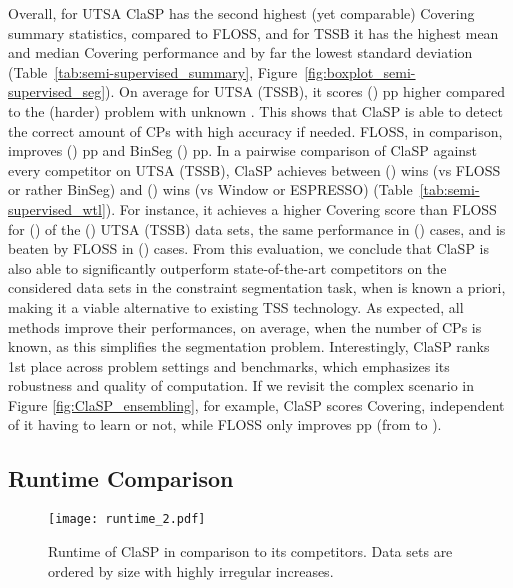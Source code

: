 \documentclass[pdflatex,sn-basic]{sn-jnl}
\begin{document}
Overall, for UTSA ClaSP has the second highest (yet comparable) Covering summary statistics, compared to FLOSS, and for TSSB it has the highest mean and median Covering performance and by far the lowest standard deviation (Table~\ref{tab:semi-supervised_summary}, Figure~\ref{fig:boxplot_semi-supervised_seg}). On average for UTSA (TSSB), it scores  () pp higher compared to the (harder) problem with unknown . This shows that ClaSP is able to detect the correct amount of CPs with high accuracy if needed. FLOSS, in comparison, improves  () pp and BinSeg  () pp. In a pairwise comparison of ClaSP against every competitor on UTSA (TSSB), ClaSP achieves between  () wins (vs FLOSS or rather BinSeg) and  () wins (vs Window or ESPRESSO) (Table~\ref{tab:semi-supervised_wtl}). For instance, it achieves a higher Covering score than FLOSS for  () of the  () UTSA (TSSB) data sets, the same performance in  () cases, and is beaten by FLOSS in  () cases. From this evaluation, we conclude that ClaSP is also able to significantly outperform state-of-the-art competitors on the considered data sets in the constraint segmentation task, when  is known a priori, making it a viable alternative to existing TSS technology. As expected, all methods improve their performances, on average, when the number of CPs is known, as this simplifies the segmentation problem. Interestingly, ClaSP ranks 1st place across problem settings and benchmarks, which emphasizes its robustness and quality of computation. If we revisit the complex scenario in Figure \ref{fig:ClaSP_ensembling}, for example, ClaSP scores  Covering, independent of it having to learn  or not, while FLOSS only improves  pp (from  to ).


\subsection{Runtime Comparison} \label{sec:runtime}

\begin{figure}[t]
	\texttt{[image: runtime\_2.pdf]}
	\caption{Runtime of ClaSP in comparison to its competitors. Data sets are ordered by size with highly irregular increases.\label{fig:runtime}}
\end{figure}
\end{document}
